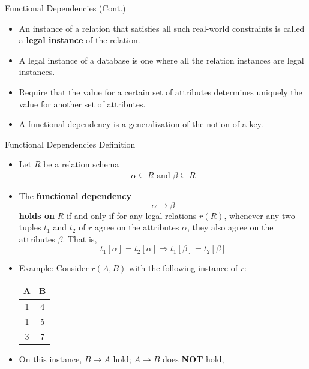\documentclass{beamer}
\begin{document}
\begin{frame}{Functional Dependencies (Cont.)}
    \begin{itemize}
        \item An instance of a relation that satisfies all such real-world constraints is called a \textbf{legal instance} of the relation.
        \item A legal instance of a database is one where all the relation instances are legal instances.
        \item Require that the value for a certain set of attributes determines uniquely the value for another set of attributes.
        \item A functional dependency is a generalization of the notion of a key.
    \end{itemize}
\end{frame}

\begin{frame}{Functional Dependencies Definition}
    \begin{itemize}
        \footnotesize
        \item Let $R$ be a relation schema
            \begin{equation*}
                \begin{align*}
                    \alpha \subseteq R \text{ and } \beta \subseteq R
                \end{align*}
            \end{equation*}
        \item The \textbf{functional dependency}
            $$
                \alpha \rightarrow \beta
            $$
            \textbf{holds on} $R$ if and only if for any legal relations $r(R)$, whenever any two tuples $t_1$ and $t_2$ of $r$ agree on the attributes $\alpha$, they also agree on the attributes $\beta$. That is,
            $$
                t_1[\alpha] = t_2[\alpha] \Rightarrow t_1[\beta] = t_2 [\beta]
            $$
        \item Example: Consider $r(A,B)$ with the following instance of $r$: \\
            \centering
            \begin{tabular}{|c|c|}
                \hline
                \textbf{A} & \textbf{B} \\ \hline
                1 & 4 \\ \hline
                1 & 5 \\ \hline
                3 & 7 \\ \hline
            \end{tabular}
        \item On this instance, $B \rightarrow A$ hold; $A \rightarrow B$ does \textbf{NOT} hold,
    \end{itemize}
\end{frame}
\end{document}
